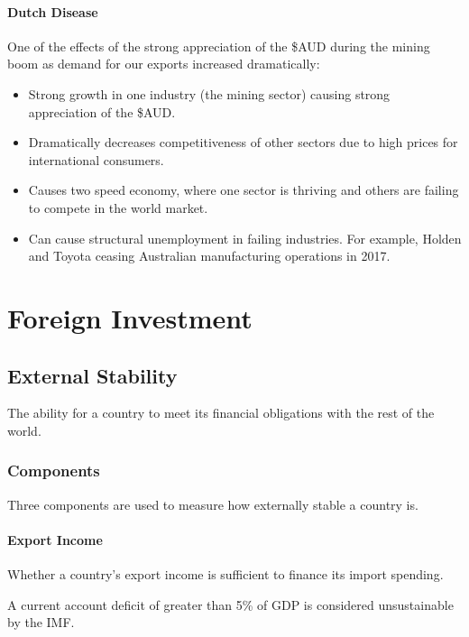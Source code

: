 \documentclass[a4paper,11pt]{report}
\begin{document}
\subsubsection{Dutch Disease}

One of the effects of the strong appreciation of the \$AUD during the mining
boom as demand for our exports increased dramatically:

\begin{itemize}
\item Strong growth in one industry (the mining sector) causing strong
	appreciation of the \$AUD.
\item Dramatically decreases competitiveness of other sectors due to high
	prices for international consumers.
\item Causes two speed economy, where one sector is thriving and others are
	failing to compete in the world market.
\item Can cause structural unemployment in failing industries. For example,
	Holden and Toyota ceasing Australian manufacturing operations in 2017.
\end{itemize}




\chapter{Foreign Investment}

\section{External Stability}

The ability for a country to meet its financial obligations with the rest of
the world.

\subsection{Components}

Three components are used to measure how externally stable a country is.

\subsubsection{Export Income}

Whether a country's export income is sufficient to finance its import spending.

A current account deficit of greater than 5\% of GDP is considered
unsustainable by the IMF.
\end{document}
